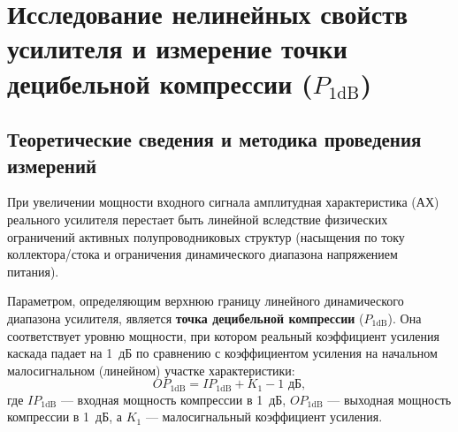 \section{Исследование нелинейных свойств усилителя и измерение точки децибельной компрессии ($P_{1\text{dB}}$)}

\subsection{Теоретические сведения и методика проведения измерений}

При увеличении мощности входного сигнала амплитудная характеристика (АХ) реального усилителя перестает быть линейной вследствие физических ограничений активных полупроводниковых структур (насыщения по току коллектора/стока и ограничения динамического диапазона напряжением питания). 

Параметром, определяющим верхнюю границу линейного динамического диапазона усилителя, является \textbf{точка децибельной компрессии} ($P_{1\text{dB}}$). Она соответствует уровню мощности, при котором реальный коэффициент усиления каскада падает на 1~дБ по сравнению с коэффициентом усиления на начальном малосигнальном (линейном) участке характеристики:
\begin{equation}
OP_{1\text{dB}} = IP_{1\text{dB}} + K_1 - 1\text{ дБ},
\end{equation}
где $IP_{1\text{dB}}$ --- входная мощность компрессии в 1~дБ, $OP_{1\text{dB}}$ --- выходная мощность компрессии в 1~дБ, а $K_1$ --- малосигнальный коэффициент усиления.


